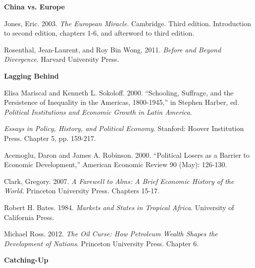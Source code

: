 \documentclass[letterpaper]{article}
\renewenvironment{itemize}{
  \begin{list}{}{
    \setlength{\leftmargin}{1.5em}
  }
}{
  \end{list}
}
\begin{document}
\begin{enumerate}
\item {\bf China vs. Europe}

	\begin{itemize}
		\item[$\bullet$] Jones, Eric. 2003. \emph{The European Miracle}. Cambridge. Third edition. Introduction to second edition, chapters 1-6, and afterword to third edition.
		\item[$\bullet$] Rosenthal, Jean-Laurent, and Roy Bin Wong. 2011. \emph{Before and Beyond Divergence}. Harvard University Press.
	\end{itemize}


\item {\bf Lagging Behind}

	\begin{itemize}
		\item[$\bullet$] Elisa Mariscal and Kenneth L. Sokoloff. 2000. ``Schooling, Suffrage, and the Persistence of Inequality in the Americas, 1800-1945,'' in Stephen Harber, ed. \emph{Political Institutions and Economic Growth in Latin America}. 
		\item[$\bullet$] \emph{Essays in Policy, History, and Political Economy}. Stanford: Hoover Institution Press. Chapter 5, pp. 159-217.
		\item[$\bullet$] Acemoglu, Daron and James A. Robinson. 2000. ``Political Losers as a Barrier to Economic Development,'' American Economic Review 90 (May): 126-130.
		\item[$\bullet$] Clark, Gregory. 2007. \emph{A Farewell to Alms: A Brief Economic History of the World}. Princeton University Press. Chapters 15-17.
		\item[$\bullet$] Robert H. Bates. 1984. \emph{Markets and States in Tropical Africa}. University of California Press.
		\item[$\bullet$] Michael Ross. 2012. \emph{The Oil Curse: How Petroleum Wealth Shapes the Development of Nations}.
		Princeton University Press. Chapter 6.
	\end{itemize}



\item {\bf Catching-Up}


\end{enumerate}
\end{document}
